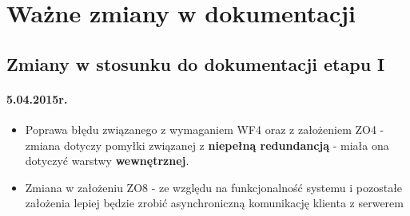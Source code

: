 \chapter{Ważne zmiany w dokumentacji}

\section{Zmiany w stosunku do dokumentacji etapu I}

\subsubsection*{5.04.2015r.}
\begin{itemize}
\item Poprawa błędu związanego z wymaganiem WF4 oraz z założeniem ZO4 - zmiana dotyczy pomyłki związanej z \textbf{niepełną redundancją} - miała ona dotyczyć warstwy \textbf{wewnętrznej}.
\item Zmiana w założeniu ZO8 - ze względu na funkcjonalność systemu i pozostałe założenia lepiej będzie zrobić asynchroniczną komunikację klienta z serwerem
\end{itemize}
